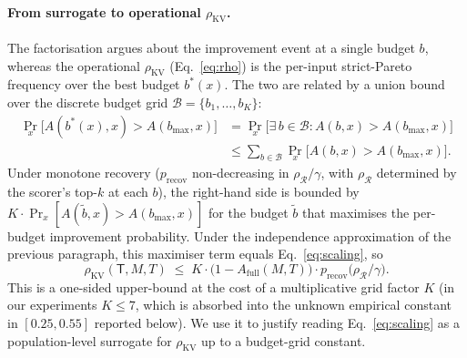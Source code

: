 \documentclass{article}
\begin{document}
\paragraph{From surrogate to operational $\rho_{\mathrm{KV}}$.} The
factorisation argues about the improvement event at a single budget $b$,
whereas the operational $\rho_{\mathrm{KV}}$ (Eq.~\eqref{eq:rho}) is the
per-input strict-Pareto frequency over the best budget $b^{*}(x)$. The
two are related by a union bound over the discrete budget grid $\mathcal{B}
= \{b_1, \dots, b_K\}$:
\begin{align*}
\Pr_x\bigl[A(b^{*}(x), x) > A(b_{\max}, x)\bigr]
&= \Pr_x\bigl[\exists\, b \in \mathcal{B} : A(b, x) > A(b_{\max}, x)\bigr] \\
&\le \sum_{b \in \mathcal{B}} \Pr_x\bigl[A(b, x) > A(b_{\max}, x)\bigr].
\end{align*}
Under monotone recovery ($p_{\mathrm{recov}}$ non-decreasing in
$\rho_{\mathcal{R}}/\gamma$, with $\rho_{\mathcal{R}}$ determined by the
scorer's top-$k$ at each $b$), the right-hand side is bounded by
$K \cdot \Pr_x[A(\widetilde b, x) > A(b_{\max}, x)]$ for the budget
$\widetilde b$ that maximises the per-budget improvement probability.
Under the independence approximation of the previous paragraph, this
maximiser term equals Eq.~\eqref{eq:scaling}, so
\[
\rho_{\mathrm{KV}}(\mathsf{T}, M, T)
\;\le\; K \cdot \bigl(1 - A_{\mathrm{full}}(M, T)\bigr)
\cdot p_{\mathrm{recov}}\bigl(\rho_{\mathcal{R}} / \gamma\bigr).
\]
This is a one-sided upper-bound at the cost of a multiplicative grid
factor $K$ (in our experiments $K \le 7$, which is absorbed into the
unknown empirical constant in $[0.25, 0.55]$ reported below). We use it
to justify reading Eq.~\eqref{eq:scaling} as a population-level surrogate
for $\rho_{\mathrm{KV}}$ up to a budget-grid constant.
\end{document}
